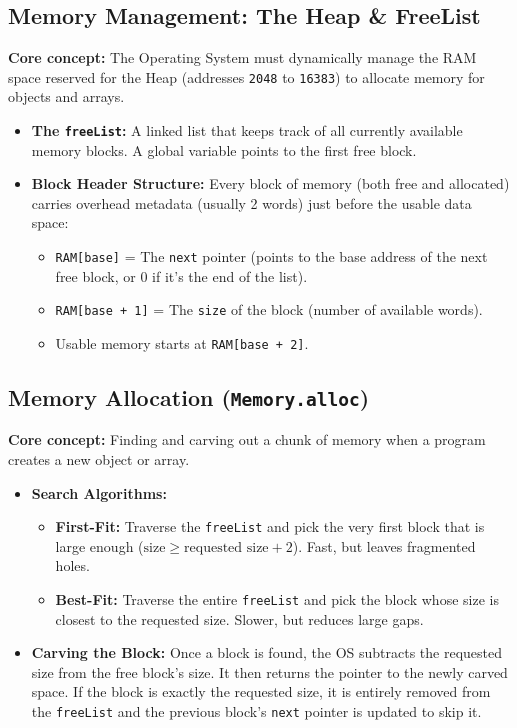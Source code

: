 \documentclass[12pt,a4paper]{article}
\begin{document}
\subsection{Memory Management: The Heap \& FreeList}
\textbf{Core concept:} The Operating System must dynamically manage the RAM space reserved for the Heap (addresses \texttt{2048} to \texttt{16383}) to allocate memory for objects and arrays.
\begin{itemize}
    \item \textbf{The \texttt{freeList}:} A linked list that keeps track of all currently available memory blocks. A global variable points to the first free block.
    \item \textbf{Block Header Structure:} Every block of memory (both free and allocated) carries overhead metadata (usually 2 words) just before the usable data space:
    \begin{itemize}
        \item \texttt{RAM[base]} = The \texttt{next} pointer (points to the base address of the next free block, or $0$ if it's the end of the list).
        \item \texttt{RAM[base + 1]} = The \texttt{size} of the block (number of available words).
        \item Usable memory starts at \texttt{RAM[base + 2]}.
    \end{itemize}
\end{itemize}

\subsection{Memory Allocation (\texttt{Memory.alloc})}
\textbf{Core concept:} Finding and carving out a chunk of memory when a program creates a new object or array.
\begin{itemize}
    \item \textbf{Search Algorithms:}
    \begin{itemize}
        \item \textbf{First-Fit:} Traverse the \texttt{freeList} and pick the very first block that is large enough ($\text{size} \geq \text{requested size} + 2$). Fast, but leaves fragmented holes.
        \item \textbf{Best-Fit:} Traverse the entire \texttt{freeList} and pick the block whose size is closest to the requested size. Slower, but reduces large gaps.
    \end{itemize}
    \item \textbf{Carving the Block:} Once a block is found, the OS subtracts the requested size from the free block's size. It then returns the pointer to the newly carved space. If the block is exactly the requested size, it is entirely removed from the \texttt{freeList} and the previous block's \texttt{next} pointer is updated to skip it.
\end{itemize}
\end{document}
